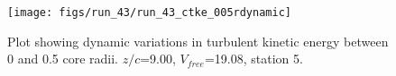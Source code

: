 \begin{figure}[H]
\centering
\texttt{[image: figs/run\_43/run\_43\_ctke\_005rdynamic]}
\caption{Plot showing dynamic variations in turbulent kinetic energy between 0 and 0.5 core radii. $z/c$=9.00, $V_{free}$=19.08, station 5.}
\label{fig:run_43_ctke_005rdynamic}
\end{figure}


